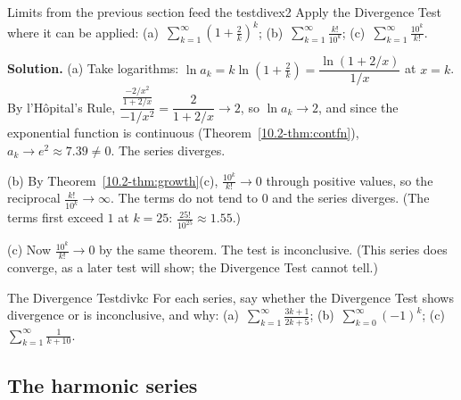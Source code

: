 \documentclass[11pt]{article}
\begin{document}
\begin{exmp}{Limits from the previous section feed the test}{divex2}
Apply the Divergence Test where it can be applied: (a)~$\displaystyle\sum_{k=1}^\infty\left(1+\frac2k\right)^k$; \quad (b)~$\displaystyle\sum_{k=1}^\infty\frac{k!}{10^k}$; \quad (c)~$\displaystyle\sum_{k=1}^\infty\frac{10^k}{k!}$.

\textbf{Solution.} (a) Take logarithms: $\ln a_k=k\ln\left(1+\frac2k\right)=\dfrac{\ln(1+2/x)}{1/x}$ at $x=k$. By l'H\^opital's Rule, $\dfrac{\frac{-2/x^2}{1+2/x}}{-1/x^2}=\dfrac2{1+2/x}\to2$, so $\ln a_k\to2$, and since the exponential function is continuous (Theorem~\ref{10.2-thm:contfn}), $a_k\to e^2\approx7.39\ne0$. The series diverges.

(b) By Theorem~\ref{10.2-thm:growth}(c), $\frac{10^k}{k!}\to0$ through positive values, so the reciprocal $\frac{k!}{10^k}\to\infty$. The terms do not tend to $0$ and the series diverges. (The terms first exceed $1$ at $k=25$: $\frac{25!}{10^{25}}\approx1.55$.)

(c) Now $\frac{10^k}{k!}\to0$ by the same theorem. The test is inconclusive. (This series does converge, as a later test will show; the Divergence Test cannot tell.)
\end{exmp}

\begin{kc}{The Divergence Test}{divkc}
For each series, say whether the Divergence Test shows divergence or is inconclusive, and why: (a)~$\displaystyle\sum_{k=1}^\infty\frac{3k+1}{2k+5}$; \quad (b)~$\displaystyle\sum_{k=0}^\infty(-1)^k$; \quad (c)~$\displaystyle\sum_{k=1}^\infty\frac1{k+10}$.
\end{kc}

\subsection*{The harmonic series}
\end{document}
